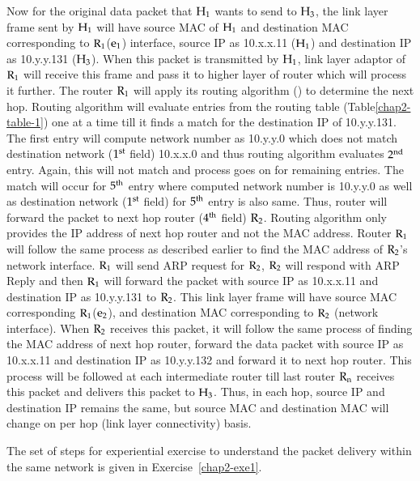 \begin{multicols}{2}
Now for the original data packet that ${\rm H}_{1}$ wants to send to ${\rm H}_{3}$, the link layer frame sent by ${\rm H}_{1}$ will have source MAC of ${\rm H}_{1}$ and destination MAC corresponding to ${\rm R}_{1}$(${\rm e}_{1}$) interface, source IP as 10.x.x.11 (${\rm H}_{1}$) and destination IP as 10.y.y.131 (${\rm H}_{3}$). When this packet is transmitted by ${\rm H}_{1}$, link layer adaptor of ${\rm R}_{1}$ will receive this frame and pass it to higher layer of router which will process it further. The router ${\rm R}_{1}$ will apply its routing algorithm () to determine the next hop. Routing algorithm will evaluate entries from the routing table (Table\ref{chap2-table-1}) one at a time till it finds a match for the destination IP of 10.y.y.131. The first entry will compute network number as   10.y.y.0 which does not match destination network ($1^{\rm st}$ field) 10.x.x.0 and thus routing algorithm evaluates $2^{\rm nd}$ entry. Again, this will not match and process goes on for remaining entries. The match will occur for $5^{\rm th}$ entry where computed network number is 10.y.y.0 as well as destination network ($1^{\rm st}$ field) for $5^{\rm th}$ entry is also same. Thus, router will forward the packet to next hop router ($4^{\rm th}$ field) ${\rm R}_{2}$. Routing algorithm only provides the IP address of next hop router and not the MAC address. Router ${\rm R}_{1}$ will follow the same process as described earlier to find the MAC address of ${\rm R}_{2}$’s network interface. ${\rm R}_{1}$ will send ARP request for ${\rm R}_{2}$, ${\rm R}_{2}$ will respond with ARP Reply and then ${\rm R}_{1}$ will forward the packet with source IP as 10.x.x.11 and destination IP as 10.y.y.131 to ${\rm R}_{2}$. This link layer frame will have source MAC corresponding ${\rm R}_{1}$(${\rm e}_{2}$), and destination MAC corresponding to ${\rm R}_{2}$ (network interface). When ${\rm R}_{2}$ receives this packet, it will follow the same process of finding the MAC address of next hop router, forward the data packet with source IP as 10.x.x.11 and destination IP as 10.y.y.132 and forward it to next hop router. This process will be followed at each intermediate router till last router ${\rm R}_{\rm n}$ receives this packet and delivers this packet to ${\rm H}_{3}$. Thus, in each hop, source IP and destination IP remains the same, but source MAC and destination MAC will change on per hop (link layer connectivity) basis.

The set of steps for experiential exercise to understand the packet delivery within the same network is given in Exercise~\ref{chap2-exe1}.


\end{multicols}
